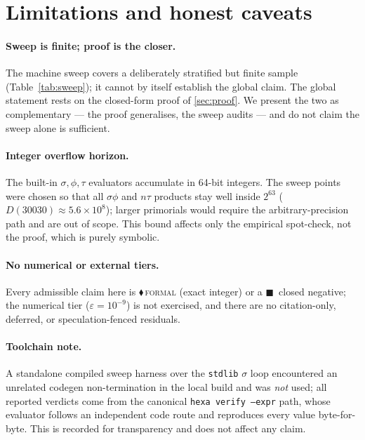\documentclass[11pt,a4paper]{article}
\newcommand{\sig}{\sigma}
\newcommand{\formal}{\textcolor{blue!60!black}{$\blacklozenge$}}
\newcommand{\falsi}{\textcolor{red!70!black}{$\blacksquare$}}
\theoremstyle{plain}
\theoremstyle{definition}
\begin{document}
\section{Limitations and honest caveats}
\label{sec:limits}

\paragraph{Sweep is finite; proof is the closer.} The machine sweep covers a
deliberately stratified but finite sample (Table~\ref{tab:sweep}); it cannot by
itself establish the global claim. The global statement rests on the
closed-form proof of \textsection\ref{sec:proof}. We present the two as
complementary --- the proof generalises, the sweep audits --- and do not claim
the sweep alone is sufficient.

\paragraph{Integer overflow horizon.} The built-in $\sig,\phi,\tau$ evaluators
accumulate in 64-bit integers. The sweep points were chosen so that all
$\sig\phi$ and $n\tau$ products stay well inside $2^{63}$
($D(30030)\approx5.6\times10^{8}$); larger primorials would require the
arbitrary-precision path and are out of scope. This bound affects only the
empirical spot-check, not the proof, which is purely symbolic.

\paragraph{No numerical or external tiers.} Every admissible claim here is
\formal\,\textsc{formal} (exact integer) or a \falsi\ closed negative; the
numerical tier ($\varepsilon=10^{-9}$) is not exercised, and there are no
citation-only, deferred, or speculation-fenced residuals.

\paragraph{Toolchain note.} A standalone compiled sweep harness over the
\texttt{stdlib} $\sig$ loop encountered an unrelated codegen non-termination in
the local build and was \emph{not} used; all reported verdicts come from the
canonical \texttt{hexa verify --expr} path, whose evaluator follows an
independent code route and reproduces every value byte-for-byte. This is
recorded for transparency and does not affect any claim.
\end{document}
